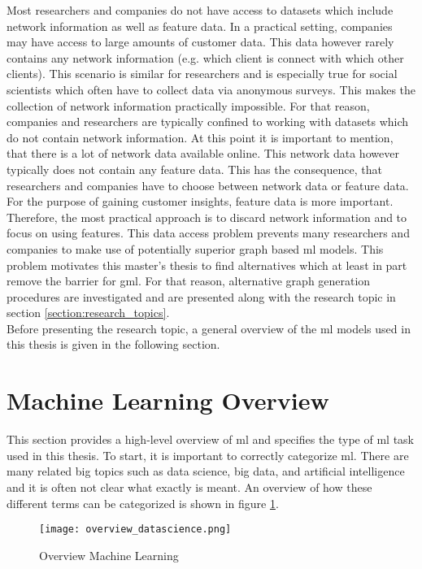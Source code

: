 	\noindent Most researchers and companies do not have access to datasets which
	include network information as well as feature data. In a practical setting,
	companies may have access to large amounts of customer data. This data
	however rarely contains any network information (e.g. which client is
	connect with which other clients). This scenario is similar for researchers
	and is especially true for social scientists which often have to collect 
	data via anonymous surveys. This makes the collection of network information 
	practically impossible. For that reason, companies and researchers are 
	typically confined to working with datasets which do not contain network 
	information. At this point it is important to mention, that there is a lot 
	of network data available online. This network data however typically does 
	not contain any feature data. This has the consequence, that researchers and 
	companies have to choose between network data or feature data. For the 
	purpose of gaining customer insights, feature data is more important. 
	Therefore, the most practical approach is to discard network information 
	and to focus on using features. This data access problem prevents many 
	researchers and companies to make use of potentially superior graph based 
	\acs{ml} models. This problem motivates this master's thesis to find
	alternatives which at least in part remove the barrier for \acs{gml}. For 
	that reason, alternative graph generation procedures are investigated and 
	are presented along with the research topic in section 
	\ref{section:research_topics}. \\

	\noindent Before presenting the research topic, a general overview of the 
	\acs{ml} models used in this thesis is given in the following section.
	
	\section{Machine Learning Overview}

	This section provides a high-level overview of \acf{ml} and
	specifies the type of \acs{ml} task used in this thesis. To start, it is 
	important to correctly categorize \acs{ml}. There are many related 
	big topics such as data science, big data, and artificial intelligence and 
	it is often not clear what exactly is meant. An overview of how these 
	different terms can be categorized is shown in figure \ref{fig:ml_overview}.

	\begin{figure}[H]
		\centering
		\texttt{[image: overview\_datascience.png]}
		\caption{Overview Machine Learning}
		\citep{Frauenhofer2021}
		\label{fig:ml_overview}
	\end{figure} 

